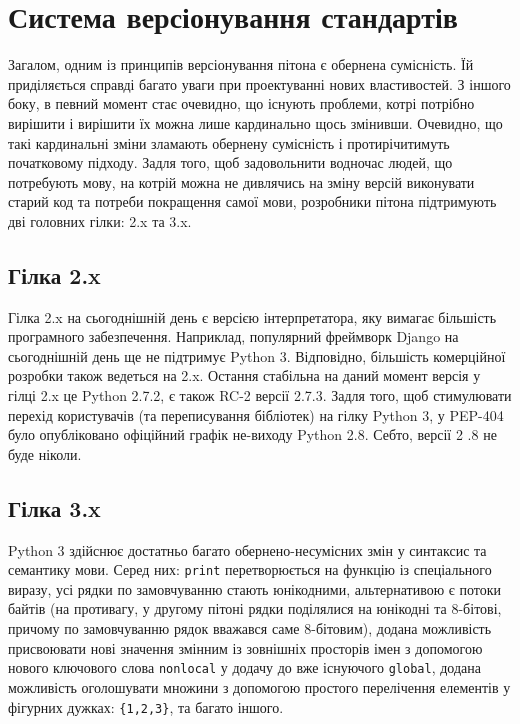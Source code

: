 \documentclass[a4paper, 12pt, onsedie]{article}
\begin{document}
\section{Система версіонування стандартів}
    Загалом, одним із принципів версіонування пітона є обернена сумісність. Їй приділяється 
    справді багато уваги при проектуванні нових властивостей. З іншого боку, в певний момент 
    стає очевидно, що існують проблеми, котрі потрібно вирішити і вирішити їх можна лише 
    кардинально щось змінивши. Очевидно, що такі кардинальні зміни зламають обернену сумісність
    і протирічитимуть початковому підходу. Задля того, щоб задовольнити водночас людей, що 
    потребують мову, на котрій можна не дивлячись на зміну версій виконувати старий код та 
    потреби покращення самої мови, розробники пітона підтримують дві головних гілки: 2.x та 3.x.


\subsection{Гілка 2.x}
    Гілка 2.x на сьогоднішній день є версією інтерпретатора, яку вимагає більшість програмного
    забезпечення. Наприклад, популярний фреймворк Django на сьогоднішній день ще не підтримує
    Python 3. Відповідно, більшість комерційної розробки також ведеться на 2.x.
    Остання стабільна на даний момент версія у гілці 2.x це Python 2.7.2, є також RC-2 версії 2.7.3.
    Задля того, щоб стимулювати перехід користувачів (та переписування бібліотек) на гілку 
    Python 3, у PEP-404 було опубліковано офіційний графік не-виходу Python 2.8. Себто, версії 2
    .8 не буде ніколи. 

\subsection{Гілка 3.x}
    Python 3 здійснює достатньо багато обернено-несумісних змін у синтаксис та семантику мови.
    Серед них: \texttt{print} перетворюється на функцію із спеціального виразу, усі рядки по
    замовчуванню стають юнікодними, альтернативою є потоки байтів (на противагу, у другому
    пітоні рядки поділялися на юнікодні та 8-бітові, причому по замовчуванню рядок вважався
    саме 8-бітовим), додана можливість присвоювати нові значення змінним із зовнішніх просторів
    імен з допомогою нового ключового слова \texttt{nonlocal} у додачу до вже існуючого 
    \texttt{global}, додана можливість оголошувати множини з допомогою простого перелічення
    елементів у фігурних дужках: \texttt{\{1,2,3\}}, та багато іншого.
\end{document}
